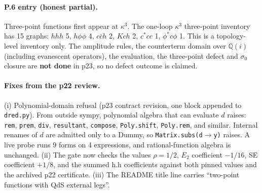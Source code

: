 \paragraph{P.6 entry (honest partial).} Three-point functions first appear at $\kappa^3$. The one-loop $\kappa^3$
three-point inventory has 15 graphs: $hhh$ 5, $h\phi\phi$ 4, $c\bar c h$ 2, $Kch$ 2, $c^*cc$ 1, $\phi^*c\phi$ 1.
This is a topology-level inventory only. The amplitude rules, the counterterm domain over $\mathbb Q(i)$
(including evanescent operators), the evaluation, the three-point defect and $\sigma_0$ closure are
\textbf{not done} in p23, so no defect outcome is claimed.

\paragraph{Fixes from the p22 review.}
(i) Polynomial-domain refusal (p23 contract revision, one block appended to \texttt{dred.py}). From outside sympy,
polynomial algebra that can evaluate $d$ raises: \texttt{rem}, \texttt{prem}, \texttt{div}, \texttt{resultant},
\texttt{compose}, \texttt{Poly.shift}, \texttt{Poly.rem}, and similar. Internal renames of $d$ are admitted only to a
Dummy, so \texttt{Matrix.subs(d}$\to$\texttt{y)} raises. A live probe runs 9 forms on 4 expressions, and
rational-function algebra is unchanged.
(ii) The gate now checks the values $\rho=1/2$, $E_2$ coefficient $-1/16$, SE coefficient $+1/8$, and the summed
h.h coefficients against both pinned values and the archived p22 certificate.
(iii) The README title line carries ``two-point functions with QdS external legs''.
